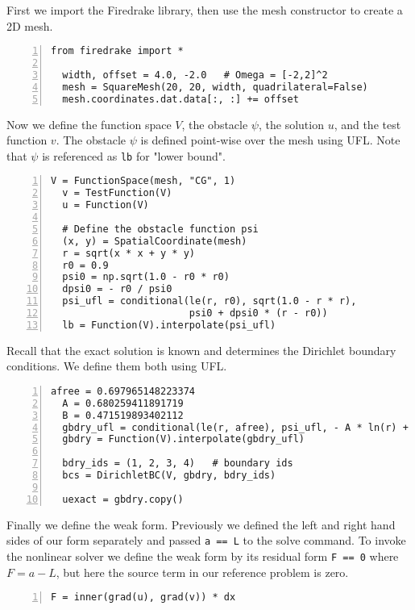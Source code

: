 \documentclass[12 pt]{report}
\begin{document}
First we import the Firedrake library, then use the mesh constructor to create a 2D mesh.
\begin{Verbatim}[frame = single,numbers = left,baselinestretch=0.75]
  from firedrake import *

  width, offset = 4.0, -2.0   # Omega = [-2,2]^2
  mesh = SquareMesh(20, 20, width, quadrilateral=False)
  mesh.coordinates.dat.data[:, :] += offset
\end{Verbatim}
Now we define the function space $V$, the obstacle $\psi$, the solution $u$, and the test function $v$. The obstacle $\psi$ is defined point-wise over the mesh using UFL. Note that $\psi$ is referenced as \texttt{lb} for "lower bound". 
\begin{Verbatim}[frame = single,numbers = left,baselinestretch=0.75, firstnumber=last]
  V = FunctionSpace(mesh, "CG", 1)
  v = TestFunction(V)
  u = Function(V)

  # Define the obstacle function psi
  (x, y) = SpatialCoordinate(mesh)
  r = sqrt(x * x + y * y)
  r0 = 0.9
  psi0 = np.sqrt(1.0 - r0 * r0)
  dpsi0 = - r0 / psi0
  psi_ufl = conditional(le(r, r0), sqrt(1.0 - r * r),
                        psi0 + dpsi0 * (r - r0))
  lb = Function(V).interpolate(psi_ufl)
\end{Verbatim}
Recall that the exact solution is known and determines the Dirichlet boundary conditions. We define them both using UFL.
\begin{Verbatim}[frame = single,numbers = left,baselinestretch=0.75, firstnumber=last]
  afree = 0.697965148223374
  A = 0.680259411891719
  B = 0.471519893402112
  gbdry_ufl = conditional(le(r, afree), psi_ufl, - A * ln(r) + B)
  gbdry = Function(V).interpolate(gbdry_ufl)
  
  bdry_ids = (1, 2, 3, 4)   # boundary ids
  bcs = DirichletBC(V, gbdry, bdry_ids)
  
  uexact = gbdry.copy()
\end{Verbatim}
Finally we define the weak form. Previously we defined the left and right hand sides of our form separately and passed \texttt{a == L} to the solve command. To invoke the nonlinear solver we define the weak form by its residual form \texttt{F == 0} where $F = a - L$, but here the source term in our reference problem is zero.
\begin{Verbatim}[frame = single,numbers = left,baselinestretch=0.75, firstnumber=last]
  F = inner(grad(u), grad(v)) * dx
\end{Verbatim}
\end{document}
